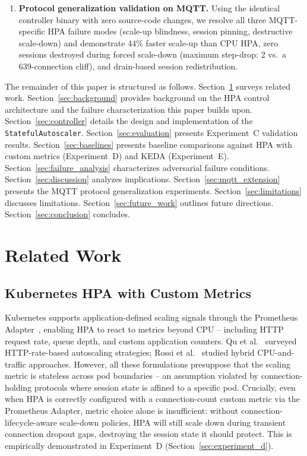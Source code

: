 \documentclass[twocolumn]{svjour3}
\begin{document}
\begin{enumerate}[leftmargin=*]
\item \textbf{Protocol generalization validation on MQTT.} Using the identical controller
  binary with zero source-code changes, we resolve all three MQTT-specific HPA failure
  modes (scale-up blindness, session pinning, destructive scale-down) and demonstrate
  44\% faster scale-up than CPU HPA, zero sessions destroyed during forced scale-down
  (maximum step-drop: 2 vs.\ a 639-connection cliff), and drain-based session redistribution.
\end{enumerate}

The remainder of this paper is structured as follows. Section~\ref{sec:related} surveys related
work. Section~\ref{sec:background} provides background on the HPA control architecture and
the failure characterization this paper builds upon. Section~\ref{sec:controller} details the
design and implementation of the \texttt{StatefulAutoscaler}. Section~\ref{sec:evaluation}
presents Experiment~C validation results. Section~\ref{sec:baselines} presents baseline
comparisons against HPA with custom metrics (Experiment~D) and KEDA (Experiment~E).
Section~\ref{sec:failure_analysis} characterizes adversarial failure conditions.
Section~\ref{sec:discussion} analyzes implications. Section~\ref{sec:mqtt_extension} presents
the MQTT protocol generalization experiments. Section~\ref{sec:limitations} discusses
limitations. Section~\ref{sec:future_work} outlines future directions. Section~\ref{sec:conclusion}
concludes.



\section{Related Work}
\label{sec:related}

\subsection{Kubernetes HPA with Custom Metrics}

Kubernetes supports application-defined scaling signals through the Prometheus
Adapter~\cite{prometheus_adapter}, enabling HPA to react to metrics beyond CPU --
including HTTP request rate, queue depth, and custom application counters. Qu et
al.~\cite{qu2018auto} surveyed HTTP-rate-based autoscaling strategies; Rossi et
al.~\cite{rossi2020horizontal} studied hybrid CPU-and-traffic approaches. However, all these
formulations presuppose that the scaling metric is stateless across pod boundaries -- an
assumption violated by connection-holding protocols where session state is affined to a
specific pod. Crucially, even when HPA is correctly configured with a connection-count custom
metric via the Prometheus Adapter, metric choice alone is insufficient: without
connection-lifecycle-aware scale-down policies, HPA will still scale down during transient
connection dropout gaps, destroying the session state it should protect. This is empirically
demonstrated in Experiment~D (Section~\ref{sec:experiment_d}).
\end{document}
